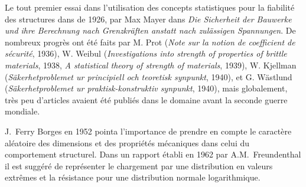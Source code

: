 \begin{histoire}
Le tout premier essai dans l'utilisation des concepts statistiques pour la fiabilité des structures dans de 1926, par Max Mayer dans \emph{Die Sicherheit der Bauwerke und ihre Berechnung nach Grenzkräften anstatt nach zulässigen Spannungen}. De nombreux progrès ont été faits par M. Prot (\emph{Note sur la notion de coefficient de sécurité}, 1936), W. Weibul (\emph{Investigations into strength of properties of brittle materials}, 1938, \emph{A statistical theory of strength of materials}, 1939), W. Kjellman (\emph{Säkerhetproblemet ur principiell och teoretisk synpunkt}, 1940), et G. Wästlund (\emph{Säkerhetproblemet ur praktisk-konstruktiv synpunkt}, 1940), mais globalement, très peu d'articles avaient été publiés dans le domaine avant la seconde guerre mondiale.

\medskip
{}

J.~Ferry Borges en 1952 pointa l'importance de prendre en compte le caractère aléatoire des dimensions et des propriétés mécaniques dans celui du comportement structurel. Dans un rapport établi en 1962 par A.M.~Freundenthal il est suggéré de représenter le chargement par une distribution en valeurs extrêmes et la résistance pour une distribution normale logarithmique.


\end{histoire}

